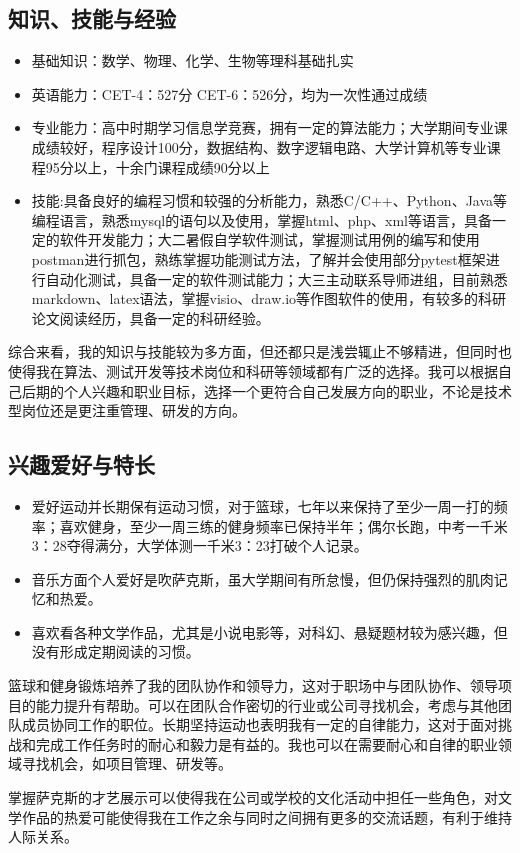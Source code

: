 \documentclass{article}
\begin{document}
\subsection{知识、技能与经验}
\begin{itemize}
	
\item 基础知识：数学、物理、化学、生物等理科基础扎实\par
\item 英语能力：CET-4：527分 CET-6：526分，均为一次性通过成绩\par
\item 专业能力：高中时期学习信息学竞赛，拥有一定的算法能力；大学期间专业课成绩较好，程序设计100分，数据结构、数字逻辑电路、大学计算机等专业课程95分以上，十余门课程成绩90分以上\par
\item 技能:具备良好的编程习惯和较强的分析能力，熟悉C/C++、Python、Java等编程语言，熟悉mysql的语句以及使用，掌握html、php、xml等语言，具备一定的软件开发能力；大二暑假自学软件测试，掌握测试用例的编写和使用postman进行抓包，熟练掌握功能测试方法，了解并会使用部分pytest框架进行自动化测试，具备一定的软件测试能力；大三主动联系导师进组，目前熟悉markdown、latex语法，掌握visio、draw.io等作图软件的使用，有较多的科研论文阅读经历，具备一定的科研经验。\par
 
\end{itemize}
\par 综合来看，我的知识与技能较为多方面，但还都只是浅尝辄止不够精进，但同时也使得我在算法、测试开发等技术岗位和科研等领域都有广泛的选择。我可以根据自己后期的个人兴趣和职业目标，选择一个更符合自己发展方向的职业，不论是技术型岗位还是更注重管理、研发的方向。
\subsection{兴趣爱好与特长}
\begin{itemize}
	
\item  爱好运动并长期保有运动习惯，对于篮球，七年以来保持了至少一周一打的频率；喜欢健身，至少一周三练的健身频率已保持半年；偶尔长跑，中考一千米3：28夺得满分，大学体测一千米3：23打破个人记录。\par
\item  音乐方面个人爱好是吹萨克斯，虽大学期间有所怠慢，但仍保持强烈的肌肉记忆和热爱。\par
\item  喜欢看各种文学作品，尤其是小说电影等，对科幻、悬疑题材较为感兴趣，但没有形成定期阅读的习惯。\par

\end{itemize}
\par 篮球和健身锻炼培养了我的团队协作和领导力，这对于职场中与团队协作、领导项目的能力提升有帮助。可以在团队合作密切的行业或公司寻找机会，考虑与其他团队成员协同工作的职位。长期坚持运动也表明我有一定的自律能力，这对于面对挑战和完成工作任务时的耐心和毅力是有益的。我也可以在需要耐心和自律的职业领域寻找机会，如项目管理、研发等。\par
掌握萨克斯的才艺展示可以使得我在公司或学校的文化活动中担任一些角色，对文学作品的热爱可能使得我在工作之余与同时之间拥有更多的交流话题，有利于维持人际关系。
\end{document}
